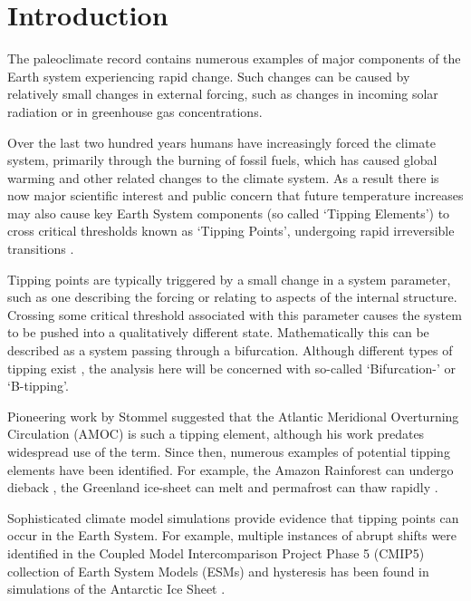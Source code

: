 \section{Introduction}\label{sec:introduction}
The paleoclimate record contains numerous examples \parencite{Brovkin2021} of 
major components of the Earth system experiencing rapid 
change. Such changes can be caused by 
relatively small changes in external forcing, such as changes in incoming
solar radiation or in greenhouse gas concentrations.

Over the last two hundred years humans have increasingly forced the climate system, 
primarily through the burning of fossil fuels,
which has caused global warming and other related changes to the climate
system. As a result there is now major scientific interest and public 
concern \parencite{Lenton2019a,Steffen2018,Ritchie2021} that future 
temperature increases may also cause key
Earth System components (so called `Tipping Elements')  to cross 
critical thresholds known as `Tipping Points', undergoing rapid 
irreversible transitions \parencite{Lenton2008}. 

Tipping points are typically triggered by a small change in a system parameter, such as one describing the forcing or
relating to aspects of the internal structure. Crossing some critical threshold associated with this parameter causes the system to be pushed into a qualitatively 
different state. Mathematically this can be described as a system passing through a bifurcation. 
Although different types of tipping exist \parencite{Ashwin2012}, the analysis here 
will be concerned with so-called `Bifurcation-' or `B-tipping'.


Pioneering work by Stommel suggested that the Atlantic Meridional Overturning 
Circulation (AMOC) \parencite{STOMMEL1961} is such a tipping element, although
his work predates widespread use of the term. Since then,
numerous examples of potential tipping elements have been identified.
For example, the Amazon Rainforest can undergo dieback \parencite{Cox2000}, the 
Greenland ice-sheet can melt \parencite{Feldmann2015} and
permafrost can thaw rapidly \parencite{Steffen2018}.

Sophisticated climate model simulations \parencite{Rahmstorf1995} provide evidence that tipping points can occur
in the Earth System. For example, multiple
instances of abrupt shifts were identified in the Coupled Model Intercomparison Project Phase 5 (CMIP5) \parencite{Taylor2012}
collection of Earth System Models (ESMs) \parencite{Drijfhout2015} and hysteresis has been found in 
simulations of the Antarctic Ice Sheet \parencite{Garbe2020}. 

